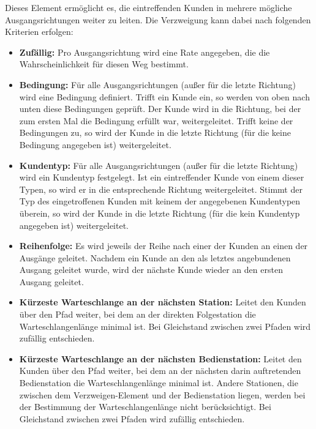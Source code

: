 Dieses Element ermöglicht es, die eintreffenden Kunden in mehrere mögliche Ausgangsrichtungen weiter zu leiten.
Die Verzweigung kann dabei nach folgenden Kriterien erfolgen:

\begin{itemize}
  \item 
    \textbf{Zufällig:}
    Pro Ausgangsrichtung wird eine Rate angegeben, die die Wahrscheinlichkeit für diesen Weg bestimmt.

  \item 
    \textbf{Bedingung:}
    Für alle Ausgangsrichtungen (außer für die letzte Richtung) wird eine Bedingung definiert. Trifft ein
    Kunde ein, so werden von oben nach unten diese Bedingungen geprüft. Der Kunde wird in die Richtung,
    bei der zum ersten Mal die Bedingung erfüllt war, weitergeleitet. Trifft keine der Bedingungen zu,
    so wird der Kunde in die letzte Richtung (für die keine Bedingung angegeben ist) weitergeleitet.    

  \item 
    \textbf{Kundentyp:}
    Für alle Ausgangsrichtungen (außer für die letzte Richtung) wird ein Kundentyp festgelegt. Ist ein
    eintreffender Kunde von einem dieser Typen, so wird er in die entsprechende Richtung weitergeleitet.
    Stimmt der Typ des eingetroffenen Kunden mit keinem der angegebenen Kundentypen überein,
    so wird der Kunde in die letzte Richtung (für die kein Kundentyp angegeben ist) weitergeleitet.

  \item 
    \textbf{Reihenfolge:}
    Es wird jeweils der Reihe nach einer der Kunden an einen der Ausgänge geleitet. Nachdem ein Kunde
    an den als letztes angebundenen Ausgang geleitet wurde, wird der nächste Kunde wieder an den
    ersten Ausgang geleitet. 

  \item 
    \textbf{Kürzeste Warteschlange an der nächsten Station:}
    Leitet den Kunden über den Pfad weiter, bei dem an der direkten Folgestation
    die Warteschlangenlänge minimal ist. Bei Gleichstand zwischen zwei Pfaden wird
    zufällig entschieden.

  \item 
    \textbf{Kürzeste Warteschlange an der nächsten Bedienstation:}
    Leitet den Kunden über den Pfad weiter, bei dem an der nächsten
    darin auftretenden Bedienstation die Warteschlangenlänge minimal ist.
    Andere Stationen, die zwischen dem Verzweigen-Element und der
    Bedienstation liegen, werden bei der Bestimmung der Warteschlangenlänge
    nicht berücksichtigt. Bei Gleichstand zwischen zwei Pfaden wird
    zufällig entschieden.


\end{itemize}
